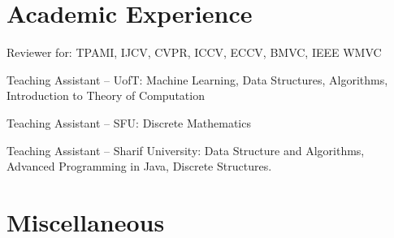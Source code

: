 \documentclass[10pt,letterpaper]{article}
\renewenvironment{itemize}{
  \begin{list}{}{
    \setlength{\leftmargin}{1.5em}
  }
}{
  \end{list}
}
\begin{document}
\begin{itemize}
\end{itemize}

\section*{Academic Experience}

\begin{itemize}

\item Reviewer for: TPAMI, IJCV, CVPR, ICCV, ECCV, BMVC, IEEE WMVC
\item Teaching Assistant -- UofT: Machine Learning, Data Structures,
  Algorithms, Introduction to Theory of Computation
\item Teaching Assistant -- SFU: Discrete Mathematics
\item Teaching Assistant -- Sharif University: Data Structure and
  Algorithms, Advanced Programming in Java, Discrete Structures.
\end{itemize}

\section*{Miscellaneous}
\end{document}
